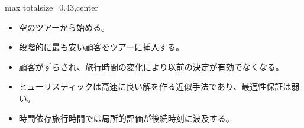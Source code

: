 \clearpage
{}
\begin{minipage}[t]{0.405\textwidth}
\begin{adjustbox}{max totalsize={\textwidth}{0.43\textheight},center}
\begin{minipage}{\textwidth}\scriptsize
{}\begin{itemize}
\item 空のツアーから始める。
\item 段階的に最も安い顧客をツアーに挿入する。
\item 顧客がずらされ、旅行時間の変化により以前の決定が有効でなくなる。
\end{itemize}\begin{itemize}
\item ヒューリスティックは高速に良い解を作る近似手法であり、最適性保証は弱い。
\item 時間依存旅行時間では局所的評価が後続時刻に波及する。
\end{itemize}
\end{minipage}
\end{adjustbox}
\end{minipage}\hfill

